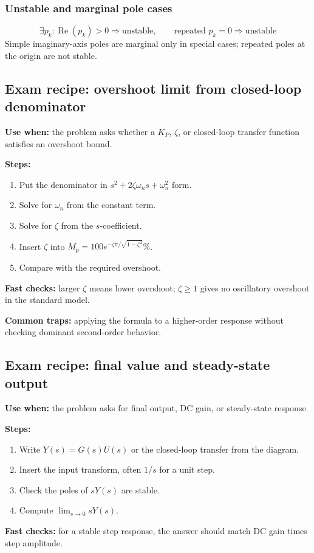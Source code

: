 \subsubsection{Unstable and marginal pole cases}
\[
\exists p_k:\operatorname{Re}(p_k)>0 \Rightarrow \text{unstable},\qquad
\text{repeated } p_k=0 \Rightarrow \text{unstable}
\]
Simple imaginary-axis poles are marginal only in special cases; repeated poles at the origin are not stable.

\subsection{Exam recipe: overshoot limit from closed-loop denominator}

\textbf{Use when:} the problem asks whether a \(K_P\), \(\zeta\), or closed-loop transfer function satisfies an overshoot bound.

\textbf{Steps:}
\begin{enumerate}
\item Put the denominator in \(s^2+2\zeta\omega_ns+\omega_n^2\) form.
\item Solve for \(\omega_n\) from the constant term.
\item Solve for \(\zeta\) from the \(s\)-coefficient.
\item Insert \(\zeta\) into \(M_p=100e^{-\zeta\pi/\sqrt{1-\zeta^2}}\%\).
\item Compare with the required overshoot.
\end{enumerate}

\textbf{Fast checks:} larger \(\zeta\) means lower overshoot; \(\zeta\geq 1\) gives no oscillatory overshoot in the standard model.

\textbf{Common traps:} applying the formula to a higher-order response without checking dominant second-order behavior.

\subsection{Exam recipe: final value and steady-state output}

\textbf{Use when:} the problem asks for final output, DC gain, or steady-state response.

\textbf{Steps:}
\begin{enumerate}
\item Write \(Y(s)=G(s)U(s)\) or the closed-loop transfer from the diagram.
\item Insert the input transform, often \(1/s\) for a unit step.
\item Check the poles of \(sY(s)\) are stable.
\item Compute \(\lim_{s\to0}sY(s)\).
\end{enumerate}

\textbf{Fast checks:} for a stable step response, the answer should match DC gain times step amplitude.
